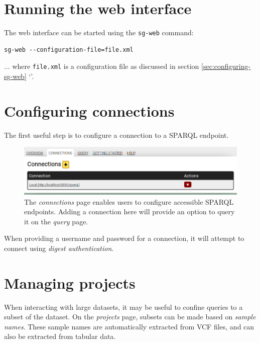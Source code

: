 \section{Running the web interface}

  The web interface can be started using the \texttt{sg-web} command:

\begin{siderules}
\begin{verbatim}
sg-web --configuration-file=file.xml
\end{verbatim}
\end{siderules}

  $\ldots{}$ where \texttt{file.xml} is a configuration file as
  discussed in section \ref{sec:configuring-sg-web}
  {\color{LinkGray}`'}.

\section{Configuring connections}
\label{sec:configure-connections}

  The first useful step is to configure a connection to a SPARQL endpoint.

  \begin{figure}[h]
    \begin{center}
      \includegraphics[width=1.0\textwidth]{figures/web-connections.png}
    \end{center}
    \caption{The \emph{connections} page enables users to configure accessible
      SPARQL endpoints.  Adding a connection here will provide an option to
      query it on the \emph{query} page.}
    \label{fig:web-connections}
  \end{figure}

  When providing a username and password for a connection, it will attempt
  to connect using \emph{digest authentication}.

\section{Managing projects}

  When interacting with large datasets, it may be useful to confine queries to
  a subset of the dataset.  On the \emph{projects} page, subsets can be made
  based on \emph{sample names}.  These sample names are automatically extracted
  from VCF files, and can also be extracted from tabular data.


